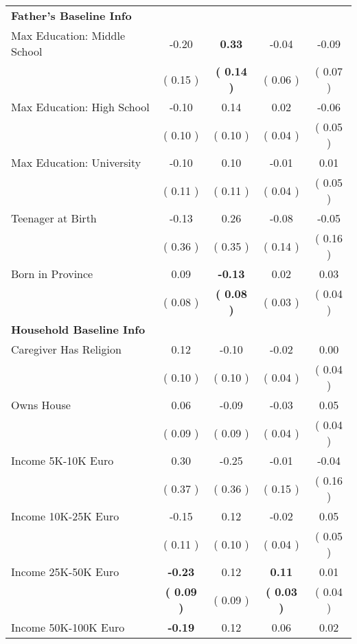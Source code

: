 \begin{table}[H]
{\begin{tabular}{lcccc}
\midrule
\textbf{Father's Baseline Info} \\
\quad Max Education: Middle School &     -0.20 & \textbf{     0.33} &     -0.04 &     -0.09 \\
\quad  & (     0.15 ) & \textbf{(     0.14 )}  & (     0.06 )  & (     0.07 )  \\
\quad Max Education: High School &     -0.10 &      0.14 &      0.02 &     -0.06 \\
\quad  & (     0.10 ) & (     0.10 )  & (     0.04 )  & (     0.05 )  \\
\quad Max Education: University &     -0.10 &      0.10 &     -0.01 &      0.01 \\
\quad  & (     0.11 ) & (     0.11 )  & (     0.04 )  & (     0.05 )  \\
\quad Teenager at Birth &     -0.13 &      0.26 &     -0.08 &     -0.05 \\
\quad  & (     0.36 ) & (     0.35 )  & (     0.14 )  & (     0.16 )  \\
\quad Born in Province &      0.09 & \textbf{    -0.13} &      0.02 &      0.03 \\
\quad  & (     0.08 ) & \textbf{(     0.08 )}  & (     0.03 )  & (     0.04 )  \\
\midrule
\textbf{Household Baseline Info} \\
\quad Caregiver Has Religion &      0.12 &     -0.10 &     -0.02 &      0.00 \\
\quad  & (     0.10 ) & (     0.10 )  & (     0.04 )  & (     0.04 )  \\
\quad Owns House &      0.06 &     -0.09 &     -0.03 &      0.05 \\
\quad  & (     0.09 ) & (     0.09 )  & (     0.04 )  & (     0.04 )  \\
\quad Income 5K-10K Euro &      0.30 &     -0.25 &     -0.01 &     -0.04 \\
\quad  & (     0.37 ) & (     0.36 )  & (     0.15 )  & (     0.16 )  \\
\quad Income 10K-25K Euro &     -0.15 &      0.12 &     -0.02 &      0.05 \\
\quad  & (     0.11 ) & (     0.10 )  & (     0.04 )  & (     0.05 )  \\
\quad Income 25K-50K Euro & \textbf{    -0.23} &      0.12 & \textbf{     0.11} &      0.01 \\
\quad  & \textbf{(     0.09 )} & (     0.09 )  & \textbf{(     0.03 )}  & (     0.04 )  \\
\quad Income 50K-100K Euro & \textbf{    -0.19} &      0.12 &      0.06 &      0.02 \\

\end{tabular}}
\end{table}
